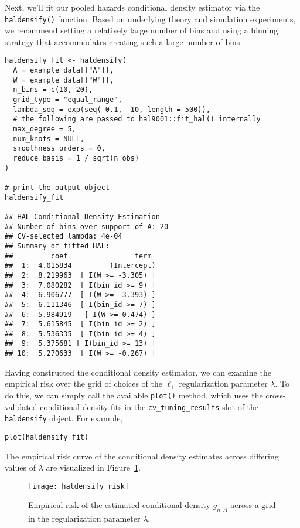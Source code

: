Next, we'll fit our pooled hazards conditional density estimator via the
\texttt{haldensify()} function. Based on underlying theory and simulation
experiments, we recommend setting a relatively large number of bins and using a
binning strategy that accommodates creating such a large number of bins.

\begin{lstlisting}
haldensify_fit <- haldensify(
  A = example_data[["A"]],
  W = example_data[["W"]],
  n_bins = c(10, 20),
  grid_type = "equal_range",
  lambda_seq = exp(seq(-0.1, -10, length = 500)),
  # the following are passed to hal9001::fit_hal() internally
  max_degree = 5,
  num_knots = NULL,
  smoothness_orders = 0,
  reduce_basis = 1 / sqrt(n_obs)
)

# print the output object
haldensify_fit

## HAL Conditional Density Estimation
## Number of bins over support of A: 20
## CV-selected lambda: 4e-04
## Summary of fitted HAL:
##         coef                term
##  1:  4.015834         (Intercept)
##  2:  8.219963  [ I(W >= -3.305) ]
##  3:  7.080282  [ I(bin_id >= 9) ]
##  4: -6.906777  [ I(W >= -3.393) ]
##  5:  6.111346  [ I(bin_id >= 7) ]
##  6:  5.984919   [ I(W >= 0.474) ]
##  7:  5.615845  [ I(bin_id >= 2) ]
##  8:  5.536335  [ I(bin_id >= 4) ]
##  9:  5.375681 [ I(bin_id >= 13) ]
## 10:  5.270633  [ I(W >= -0.267) ]
\end{lstlisting}

Having constructed the conditional density estimator, we can examine the
empirical risk over the grid of choices of the $\ell_1$ regularization parameter
$\lambda$. To do this, we can simply call the available \texttt{plot()} method,
which uses the cross-validated conditional density fits in the
\texttt{cv\_tuning\_results} slot of the \texttt{haldensify} object. For example,

\begin{lstlisting}
plot(haldensify_fit)
\end{lstlisting}

The empirical risk curve of the conditional density estimates across differing
values of $\lambda$ are visualized in Figure~\ref{fig:haldensify_risk}.
\begin{figure}[H]
  \centering
  \texttt{[image: haldensify\_risk]}
  \caption{Empirical risk of the estimated conditional density $g_{n,A}$ across
      a grid in the regularization parameter $\lambda$.}
  \label{fig:haldensify_risk}
\end{figure}


